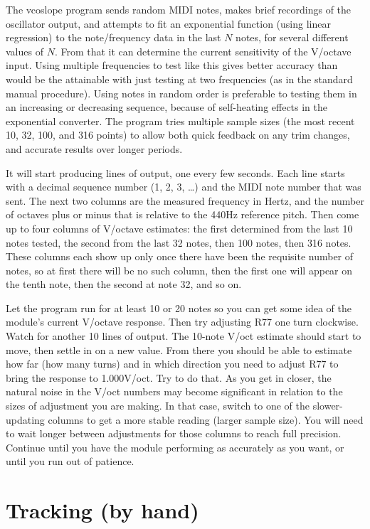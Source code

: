 The vcoslope program sends random MIDI notes, makes brief recordings of the
oscillator output, and attempts to fit an exponential function (using linear
regression) to the note/frequency data in the last $N$ notes, for several
different values of $N$.  From that it can determine the current sensitivity
of the V/octave input.  Using multiple frequencies to test like this gives
better accuracy than would be the attainable with just testing at two
frequencies (as in the standard manual procedure).  Using notes in random
order is preferable to testing them in an increasing or decreasing sequence,
because of self-heating effects in the exponential converter.  The program
tries multiple sample sizes (the most recent 10, 32, 100, and 316 points)
to allow both quick feedback on any trim changes, and accurate results over
longer periods.

It will start producing lines of output, one every few seconds.  Each
line starts with a decimal sequence number (1, 2, 3, \ldots) and the MIDI
note number that was sent.  The next two columns are the measured frequency
in Hertz, and the number of octaves plus or minus that is relative to the
440Hz reference pitch.  Then come up to four columns of V/octave estimates:
the first determined from the last 10 notes tested, the second from the last
32 notes, then 100 notes, then 316 notes.  These columns each show up only
once there have been the requisite number of notes, so at first there will
be no such column, then the first one will appear on the tenth note, then
the second at note 32, and so on.

Let the program run for at least 10 or 20 notes so you can get some idea of
the module's current V/octave response.  Then try adjusting R77 one turn
clockwise.  Watch for another 10 lines of output.  The 10-note V/oct
estimate should start to move, then settle in on a new value.  From there
you should be able to estimate how far (how many turns) and in which
direction you need to adjust R77 to bring the response to 1.000V/oct.  Try
to do that.  As you get in closer, the natural noise in the V/oct numbers
may become significant in relation to the sizes of adjustment you are
making.  In that case, switch to one of the slower-updating columns to get a
more stable reading (larger sample size).  You will need to wait longer
between adjustments for those columns to reach full precision.  Continue
until you have the module performing as accurately as you want, or until you
run out of patience.

\section{Tracking (by hand)}

